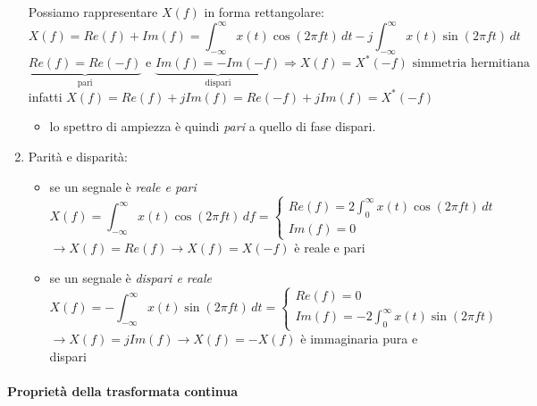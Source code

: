 \documentclass[
  paper=a4,
  ,captions=tableheading
]{scrartcl}
\providecommand{\tightlist}{%
  \setlength{\itemsep}{0pt}\setlength{\parskip}{0pt}}
\begin{document}
\begin{enumerate}
  Possiamo rappresentare \(X(f)\) in forma rettangolare: \[
  X(f) = Re(f) + Im(f) = \int_{-\infty}^\infty x(t) \cos(2\pi ft) \,dt - j\int_{-\infty}^\infty x(t) \sin(2\pi ft) \,dt
  \] \[
  \underbrace{Re(f)=Re(-f)}_{\text{pari}} \text{ e } \underbrace{Im(f)=-Im(-f)}_{\text{dispari}} \Longrightarrow X(f)=X^{*}(-f) \text{ simmetria hermitiana}
  \] infatti \(X(f)=Re(f)+jIm(f)=Re(-f)+jIm(f)=X^{*}(-f)\)

  \begin{itemize}
  \tightlist
  \item
    lo spettro di ampiezza è quindi \emph{pari} a quello di fase
    dispari.
  \end{itemize}
\item
  Parità e disparità:

  \begin{itemize}
  \tightlist
  \item
    se un segnale è \emph{reale e pari} \[
    X(f) = \int_{-\infty}^\infty x(t) \cos(2\pi ft) \,df=
    \left\{ \begin{array}{cl}
    Re(f) = 2\int_{0}^\infty x(t) \cos(2\pi ft) \,dt \\
    Im(f) = 0
    \end{array} \right.
    \] \(\to X(f) = Re(f) \to X(f)=X(-f)\) è reale e pari
  \item
    se un segnale è \emph{dispari e reale} \[
    X(f) = - \int_{-\infty}^\infty x(t) \sin(2\pi ft) \,dt=
    \left\{ \begin{array}{cl}
    Re(f) = 0 \\
    Im(f) = -2\int_{0}^\infty x(t) \sin(2\pi ft) 
    \end{array} \right.
    \] \(\to X(f)=jIm(f) \to X(f)=-X(f)\) è immaginaria pura e dispari
  \end{itemize}
\end{enumerate}

\paragraph{Proprietà della trasformata
continua}\label{proprietuxe0-della-trasformata-continua}
\end{document}
